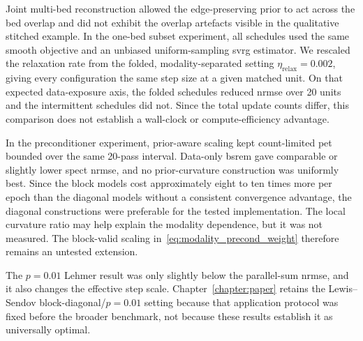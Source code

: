 Joint multi-bed reconstruction allowed the edge-preserving prior to act across the bed overlap and did not exhibit the overlap artefacts visible in the qualitative stitched example. In the one-bed subset experiment, all schedules used the same smooth objective and an unbiased uniform-sampling \gls{svrg} estimator. We rescaled the relaxation rate from the folded, modality-separated setting $\eta_{\mathrm{relax}}=0.002$, giving every configuration the same step size at a given matched unit. On that expected data-exposure axis, the folded schedules reduced \gls{nrmse} over 20 units and the intermittent schedules did not. Since the total update counts differ, this comparison does not establish a wall-clock or compute-efficiency advantage.

In the preconditioner experiment, prior-aware scaling kept count-limited \gls{pet} bounded over the same 20-pass interval. Data-only \gls{bsrem} gave comparable or slightly lower \gls{spect} \gls{nrmse}, and no prior-curvature construction was uniformly best. Since the block models cost approximately eight to ten times more per epoch than the diagonal models without a consistent convergence advantage, the diagonal constructions were preferable for the tested implementation. The local curvature ratio may help explain the modality dependence, but it was not measured. The block-valid scaling in~\eqref{eq:modality_precond_weight} therefore remains an untested extension.

The $p=0.01$ Lehmer result was only slightly below the parallel-sum \gls{nrmse}, and it also changes the effective step scale. Chapter~\ref{chapter:paper} retains the Lewis--Sendov block-diagonal/$p=0.01$ setting because that application protocol was fixed before the broader benchmark, not because these results establish it as universally optimal.
